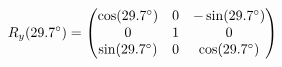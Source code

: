 \documentclass[preview]{standalone}
\begin{document}
\begin{align*}
\special{dvisvgm:raw <g id='unique000'>}R_y(29.7^\circ) = \begin{pmatrix} \cos(29.7^\circ) & 0 & -\sin(29.7^\circ) \\ 0 & 1 & 0 \\ \sin(29.7^\circ) & 0 & \cos(29.7^\circ) \end{pmatrix}\special{dvisvgm:raw </g>}
\end{align*}
\end{document}
